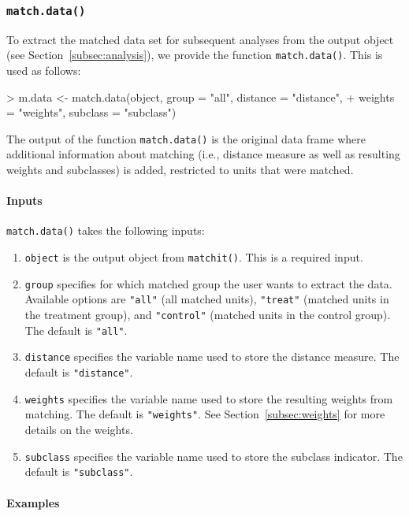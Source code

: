 \documentclass[oneside,letterpaper,titlepage]{article}
\begin{document}
\subsubsection{{\tt match.data()}}
\label{subsec:match.data}

To extract the matched data set for subsequent analyses from the
output object (see Section~\ref{subsec:analysis}), we provide the
function {\tt match.data()}.  This is used as follows:
\begin{Schunk}
\begin{Sinput}
> m.data <- match.data(object, group = "all", distance = "distance", 
+     weights = "weights", subclass = "subclass")
\end{Sinput}
\end{Schunk}
The output of the function {\tt match.data()} is the original data
frame where additional information about matching (i.e., distance
measure as well as resulting weights and subclasses) is added,
restricted to units that were matched.

\paragraph{Inputs}

{\tt match.data()} takes the following inputs:
\begin{enumerate}
\item {\tt object} is the output object from {\tt matchit()}. This is
  a required input.
\item {\tt group} specifies for which matched group the user wants to
  extract the data. Available options are {\tt "all"} (all matched
  units), {\tt "treat"} (matched units in the treatment group), and
  {\tt "control"} (matched units in the control group). The default is
  {\tt "all"}.
\item {\tt distance} specifies the variable name used to store the
  distance measure. The default is {\tt "distance"}.
\item {\tt weights} specifies the variable name used to store the
  resulting weights from matching. The default is {\tt "weights"}. See
  Section~\ref{subsec:weights} for more details on the weights.
\item {\tt subclass} specifies the variable name used to store the
  subclass indicator. The default is {\tt "subclass"}.
\end{enumerate}

\paragraph{Examples}
\end{document}
